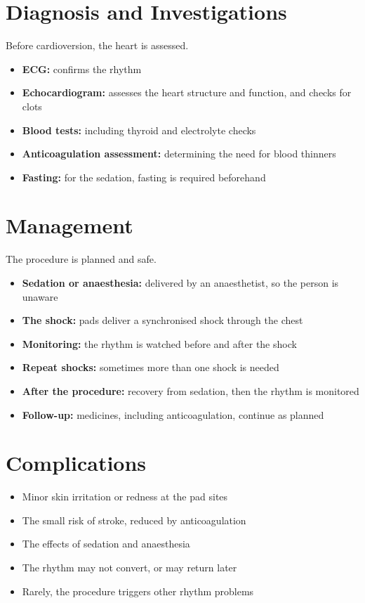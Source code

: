 \section*{Diagnosis and Investigations}
Before cardioversion, the heart is assessed.
\begin{itemize}
    \item \textbf{ECG:} confirms the rhythm
    \item \textbf{Echocardiogram:} assesses the heart structure and function, and checks for clots
    \item \textbf{Blood tests:} including thyroid and electrolyte checks
    \item \textbf{Anticoagulation assessment:} determining the need for blood thinners
    \item \textbf{Fasting:} for the sedation, fasting is required beforehand
\end{itemize}

\section*{Management}
The procedure is planned and safe.
\begin{itemize}
    \item \textbf{Sedation or anaesthesia:} delivered by an anaesthetist, so the person is unaware
    \item \textbf{The shock:} pads deliver a synchronised shock through the chest
    \item \textbf{Monitoring:} the rhythm is watched before and after the shock
    \item \textbf{Repeat shocks:} sometimes more than one shock is needed
    \item \textbf{After the procedure:} recovery from sedation, then the rhythm is monitored
    \item \textbf{Follow-up:} medicines, including anticoagulation, continue as planned
\end{itemize}

\section*{Complications}
\begin{itemize}
    \item Minor skin irritation or redness at the pad sites
    \item The small risk of stroke, reduced by anticoagulation
    \item The effects of sedation and anaesthesia
    \item The rhythm may not convert, or may return later
    \item Rarely, the procedure triggers other rhythm problems
\end{itemize}

